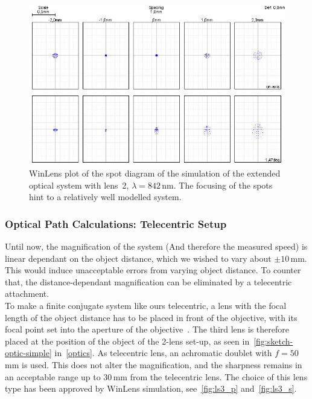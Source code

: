 \documentclass[12pt,a4paper]{article}
\begin{document}
\begin{figure}[htbp]
\begin{center}
\includegraphics[width=1\columnwidth]{figures/spot_diagram_2lenses.png}
\caption{\label{fig:ls2_s}
WinLens plot of the spot diagram of the simulation of the extended optical system with lens~2, $\lambda = 842$\,nm.
The focusing of the spots hint to a relatively well modelled system.
}
\end{center}
\end{figure}

\subsubsection{Optical Path Calculations: Telecentric Setup}

Until now, the magnification of the system (And therefore the measured speed) is linear dependant on the object distance, which we wished to vary about $\pm 10$\,mm.
This would induce unacceptable errors from varying object distance.
To counter that, the distance-dependant magnification can be eliminated by a telecentric attachment.\\
To make a finite conjugate system like ours telecentric, a lens with the focal length of the object distance has to be placed in front of the objective, with its focal point set into the aperture of the objective~\cite{telec}.
The third lens is therefore placed at the position of the object of the 2-lens set-up, as seen in~\autoref{fig:sketch-optic-simple} in~\autoref{optics}.
As telecentric lens, an achromatic doublet with $f=50$\,mm is used.
This does not alter the magnification, and the sharpness remains in an acceptable range up to 30\,mm from the telecentric lens.
The choice of this lens type has been approved by WinLens simulation, see~\autoref{fig:ls3_p} and~\autoref{fig:ls3_s}.
\end{document}
